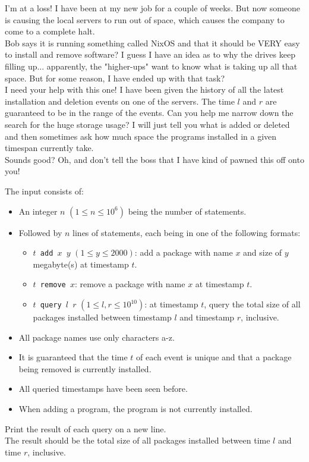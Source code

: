
\newcommand{\maxn}{10^6}
\newcommand{\maxy}{2000}
\newcommand{\maxlr}{10^{10}}

I'm at a loss! I have been at my new job for a couple of weeks. But now someone is causing the local servers to run out of space, which causes the company to come to a complete halt.\\

Bob says it is running something called NixOS and that it should be VERY easy to install and remove software? I guess I have an idea as to why the drives keep filling up... apparently, the "higher-ups" want to know what is taking up all that space. But for some reason, I have ended up with that task? \\

I need your help with this one! I have been given the history of all the latest installation and deletion events on one of the servers. The time $l$ and $r$ are guaranteed to be in the range of the events. Can you help me narrow down the search for the huge storage usage? I will just tell you what is added or deleted and then sometimes ask how much space the programs installed in a given timespan currently take.\\

Sounds good? Oh, and don't tell the boss that I have kind of pawned this off onto you!\\

\begin{Input}
    The input consists of:
    \begin{itemize}
        \item An integer $n$ $(1 \leq n  \leq \maxn)$ being the number of statements.
        \item Followed by $n$ lines of statements, each being in one of the following formats:

        \begin{itemize}
            \item \texttt{$t$ add $x$ $y$} $(1 \leq y \leq \maxy)$: add a package with name $x$ and size of $y$ megabyte(s) at timestamp $t$.
            \item \texttt{$t$ remove $x$}: remove a package with name $x$ at timestamp $t$.
            \item \texttt{$t$ query $l$ $r$} $(1 \leq l, r \leq \maxlr)$:  at timestamp $t$, query the total size of all packages installed between timestamp $l$ and timestamp $r$, inclusive.
        \end{itemize}
        \item All package names use only characters a-z.
        \item It is guaranteed that the time $t$ of each event is unique and that a package being removed is currently installed.
        \item All queried timestamps have been seen before.
        \item When adding a program, the program is not currently installed.
    \end{itemize}
\end{Input}

\begin{Output}
    Print the result of each query on a new line.\\
    The result should be the total size of all packages installed between time $l$ and time $r$, inclusive.
\end{Output}
